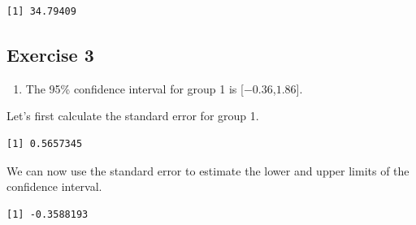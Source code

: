 \documentclass[
  letterpaper,
  DIV=11,
  numbers=noendperiod]{scrreprt}
\newenvironment{Shaded}{\begin{snugshade}}{\end{snugshade}}
\newcommand{\DecValTok}[1]{\textcolor[rgb]{0.68,0.00,0.00}{#1}}
\newcommand{\FloatTok}[1]{\textcolor[rgb]{0.68,0.00,0.00}{#1}}
\newcommand{\FunctionTok}[1]{\textcolor[rgb]{0.28,0.35,0.67}{#1}}
\newcommand{\NormalTok}[1]{\textcolor[rgb]{0.00,0.23,0.31}{#1}}
\newcommand{\OtherTok}[1]{\textcolor[rgb]{0.00,0.23,0.31}{#1}}
\newcommand{\SpecialCharTok}[1]{\textcolor[rgb]{0.37,0.37,0.37}{#1}}
\providecommand{\tightlist}{%
  \setlength{\itemsep}{0pt}\setlength{\parskip}{0pt}}\usepackage{longtable,booktabs,array}
\begin{document}
\begin{verbatim}
[1] 34.79409
\end{verbatim}

\hypertarget{exercise-3-23}{%
\subsection*{Exercise 3}\label{exercise-3-23}}

\begin{enumerate}
\def\labelenumi{\arabic{enumi}.}
\tightlist
\item
  The 95\% confidence interval for group 1 is {[}\(-0.36\),\(1.86\){]}.
\end{enumerate}

Let's first calculate the standard error for group 1.

\begin{Shaded}
\end{Shaded}

\begin{verbatim}
[1] 0.5657345
\end{verbatim}

We can now use the standard error to estimate the lower and upper limits
of the confidence interval.

\begin{Shaded}
\end{Shaded}

\begin{verbatim}
[1] -0.3588193
\end{verbatim}
\end{document}
